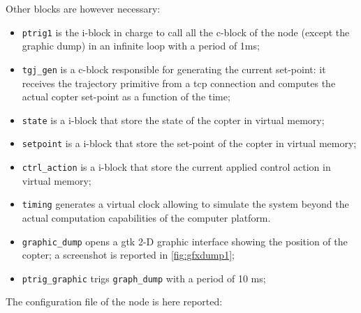Other blocks are however necessary:
\begin{itemize}
	\item \texttt{ptrig1} is the i-block in charge to call all the c-block of the node (except the graphic dump) in an infinite loop with a period of 1ms;
	\item \texttt{tgj\_gen} is a c-block responsible for generating the current set-point: it receives the trajectory primitive from a tcp connection and computes the actual copter set-point as a function of the time;
	\item \texttt{state} is a i-block that store the state of the copter in virtual memory;
	\item \texttt{setpoint} is a i-block that store the set-point of the copter in virtual memory;
	\item \texttt{ctrl\_action} is a i-block that store the current applied control action in virtual memory;
	\item \texttt{timing} generates a virtual clock allowing to simulate the system beyond the actual computation capabilities of the computer platform.
	\item \texttt{graphic\_dump} opens a gtk 2-D graphic interface showing the position of the copter; a screenshot is reported in \autoref{fig:gfxdump1};
	\item \texttt{ptrig\_graphic} trigs \texttt{graph\_dump} with a period of 10 ms;
\end{itemize}

The configuration file of the node is here reported:
	
